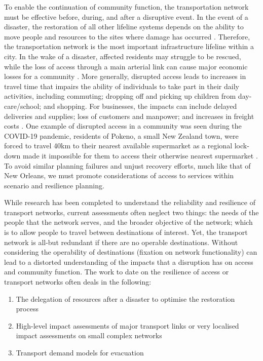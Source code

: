 \documentclass[review,3p,times,onecolumn,sort&compress,12pt]{elsarticle}
\let \cite \parencite
\begin{document}
To enable the continuation of community function, the transportation network must be effective before, during, and after a disruptive event.
In the event of a disaster, the restoration of all other lifeline systems depends on the ability to move people and resources to the sites where damage has occurred \cite{Hopkins1991-ok}.
Therefore, the transportation network is the most important infrastructure lifeline within a city.
In the wake of a disaster, affected residents may struggle to be rescued, while the loss of access through a main arterial link can cause major economic losses for a community \cite{Dalziell2001-un}.
More generally, disrupted access leads to increases in travel time that impairs the ability of individuals to take part in their daily activities, including commuting; dropping off and picking up children from day-care/school; and shopping.
For businesses, the impacts can include delayed deliveries and supplies; loss of customers and manpower; and increases in freight costs \cite{Jenelius2012-vp}.
One example of disrupted access in a community was seen during the COVID-19 pandemic, residents of Pokeno, a small New Zealand town, were forced to travel 40km to their nearest available supermarket as a regional lock-down made it impossible for them to access their otherwise nearest supermarket \cite{Preston2020-fc}.
To avoid similar planning failures and unjust recovery efforts, much like that of New Orleans, we must promote considerations of access to services within scenario and resilience planning.

While research has been completed to understand the reliability and resilience of transport networks, current assessments often neglect two things: the needs of the people that the network serves, and the broader objective of the network; which is to allow people to travel between destinations of interest.
Yet, the transport network is all-but redundant if there are no operable destinations.
Without considering the operability of destinations (fixation on network functionality) can lead to a distorted understanding of the impacts that a disruption has on access and community function.
The work to date on the resilience of access or transport networks often deals in the following:

\begin{enumerate}
    \item The delegation of resources after a disaster to optimise the restoration process \cite{Sun2020-ln, Li2020-nq, Ozdamar2014-fh, Tuzun_Aksu2014-gq}
    \item High-level impact assessments of major transport links or very localised impact assessments on small complex networks \cite{Dalziell2001-un, Khademi2015-jq, Tuzun_Aksu2014-gq, Nicholson2007-zc, Jenelius2012-vp, Chang2001-bq, Bono2011-dk, Sohn2006-vg, Taylor2012-jw}
    \item Transport demand models for evacuation \cite{Tuzun_Aksu2014-gq, Cova1997-vl}
\end{enumerate}
\end{document}
